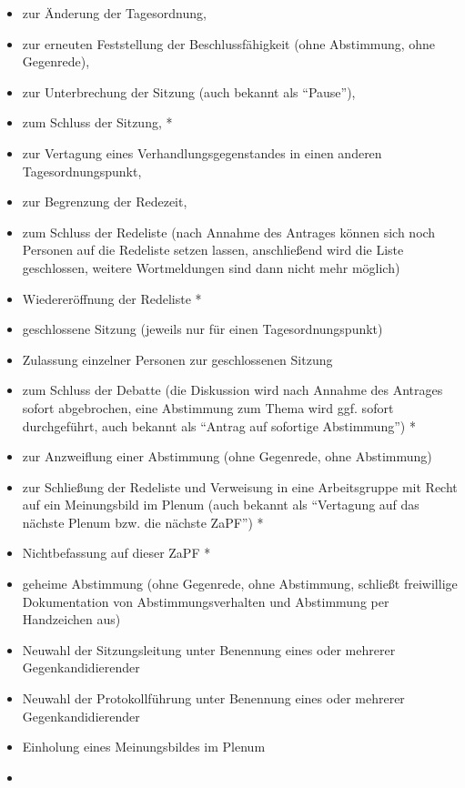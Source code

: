 \documentclass[
  a4paper,
  oneside]{scrartcl}
\providecommand{\tightlist}{%
  \setlength{\itemsep}{0pt}\setlength{\parskip}{0pt}}
\begin{document}
\begin{enumerate}
  \begin{itemize}
  \tightlist
  \item
    zur Änderung der Tagesordnung,
  \item
    zur erneuten Feststellung der Beschlussfähigkeit (ohne Abstimmung,
    ohne Gegenrede),
  \item
    zur Unterbrechung der Sitzung (auch bekannt als ``Pause''),
  \item
    zum Schluss der Sitzung, *
  \item
    zur Vertagung eines Verhandlungsgegenstandes in einen anderen
    Tagesordnungspunkt,
  \item
    zur Begrenzung der Redezeit,
  \item
    zum Schluss der Redeliste (nach Annahme des Antrages können sich
    noch Personen auf die Redeliste setzen lassen, anschließend wird die
    Liste geschlossen, weitere Wortmeldungen sind dann nicht mehr
    möglich)
  \item
    Wiedereröffnung der Redeliste *
  \item
    geschlossene Sitzung (jeweils nur für einen Tagesordnungspunkt)
  \item
    Zulassung einzelner Personen zur geschlossenen Sitzung
  \item
    zum Schluss der Debatte (die Diskussion wird nach Annahme des
    Antrages sofort abgebrochen, eine Abstimmung zum Thema wird ggf.
    sofort durchgeführt, auch bekannt als ``Antrag auf sofortige
    Abstimmung'') *
  \item
    zur Anzweiflung einer Abstimmung (ohne Gegenrede, ohne Abstimmung)
  \item
    zur Schließung der Redeliste und Verweisung in eine Arbeitsgruppe
    mit Recht auf ein Meinungsbild im Plenum (auch bekannt als
    ``Vertagung auf das nächste Plenum bzw. die nächste ZaPF'') *
  \item
    Nichtbefassung auf dieser ZaPF *
  \item
    geheime Abstimmung (ohne Gegenrede, ohne Abstimmung, schließt
    freiwillige Dokumentation von Abstimmungsverhalten und Abstimmung
    per Handzeichen aus)
  \item
    Neuwahl der Sitzungsleitung unter Benennung eines oder mehrerer
    Gegenkandidierender
  \item
    Neuwahl der Protokollführung unter Benennung eines oder mehrerer
    Gegenkandidierender
  \item
    Einholung eines Meinungsbildes im Plenum
  \item

\end{itemize}
\end{enumerate}
\end{document}
